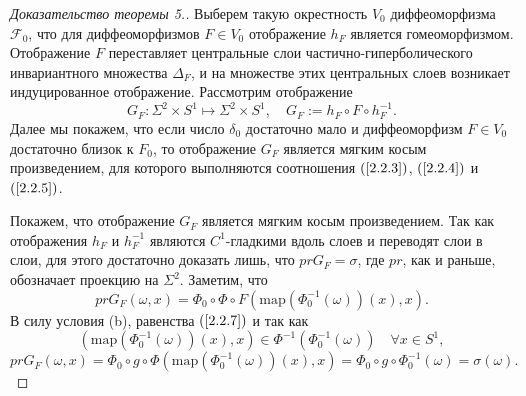 \documentclass[12pt]{article}
\begin{document}
\begin{proof}[Доказательство теоремы 5.]
Выберем такую окрестность $V_0$ диффеоморфизма $\mathcal{F}_0$, что для диффеоморфизмов $F\in V_0$ отображение $h_F$ является гомеоморфизмом.
Отображение $F$ переставляет центральные слои частично-гиперболического инвариантного множества $\Delta_F$, и на множестве этих центральных слоев возникает индуцированное отображение.
Рассмотрим отображение
$$G_F:\Sigma^2\times S^1\mapsto\Sigma^2\times S^1,\quad G_F:=h_F\circ F\circ h^{-1}_F.$$
Далее мы покажем, что если число $\delta_0$  достаточно мало и диффеоморфизм $F\in V_0$ достаточно близок к $F_0$, то отображение $G_F$ является мягким косым произведением, для которого выполняются соотношения $(\ref{2.2.3})$, $(\ref{2.2.4})$ и $(\ref{2.2.5})$.  

Покажем, что отображение $G_F$ является мягким косым произведением. Так как отображения $h_F$ и $h_F^{-1}$ являются $C^1$-гладкими вдоль слоев и переводят слои в слои, для этого достаточно доказать лишь, что $pr G_F=\sigma$, где $pr$, как и раньше, обозначает проекцию на $\Sigma^2$. Заметим, что
\begin{equation}
\label{2.2.7}
pr G_F(\omega,x)=\Phi_0\circ\Phi\circ F(\mbox{map}(\Phi_0^{-1}(\omega))(x),x).
\end{equation}
 В силу условия (b), равенства $(\ref{2.2.7})$ и так как 
$$(\mbox{map}(\Phi_0^{-1}(\omega))(x),x)\in \Phi^{-1}(\Phi_0^{-1}(\omega))\quad\forall x\in S^1,$$
$$pr G_F(\omega,x)=\Phi_0\circ g\circ\Phi (\mbox{map}(\Phi_0^{-1}(\omega))(x),x) =\Phi_0\circ g\circ\Phi_0^{-1}(\omega)=\sigma(\omega).$$


\end{proof}
\end{document}
